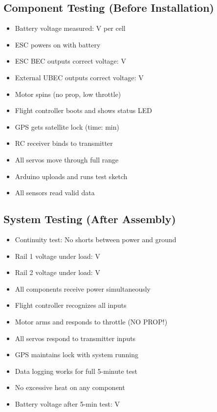 \documentclass[10pt,letterpaper]{article}
\begin{document}
\subsection*{Component Testing (Before Installation)}
\begin{itemize}[label=$\square$,nosep]
\item Battery voltage measured: \underline{\hspace{2cm}} V per cell
\item ESC powers on with battery
\item ESC BEC outputs correct voltage: \underline{\hspace{2cm}} V
\item External UBEC outputs correct voltage: \underline{\hspace{2cm}} V
\item Motor spins (no prop, low throttle)
\item Flight controller boots and shows status LED
\item GPS gets satellite lock (time: \underline{\hspace{2cm}} min)
\item RC receiver binds to transmitter
\item All servos move through full range
\item Arduino uploads and runs test sketch
\item All sensors read valid data
\end{itemize}

\subsection*{System Testing (After Assembly)}
\begin{itemize}[label=$\square$,nosep]
\item Continuity test: No shorts between power and ground
\item Rail 1 voltage under load: \underline{\hspace{2cm}} V
\item Rail 2 voltage under load: \underline{\hspace{2cm}} V
\item All components receive power simultaneously
\item Flight controller recognizes all inputs
\item Motor arms and responds to throttle (NO PROP!)
\item All servos respond to transmitter inputs
\item GPS maintains lock with system running
\item Data logging works for full 5-minute test
\item No excessive heat on any component
\item Battery voltage after 5-min test: \underline{\hspace{2cm}} V
\end{itemize}
\end{document}
